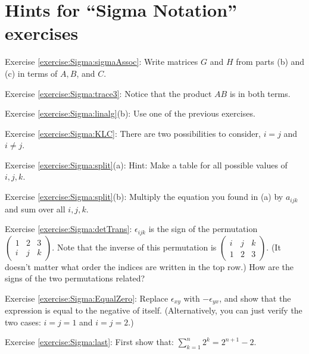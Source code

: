 \section{Hints for ``Sigma Notation'' exercises}\label{sec:sigma:hints} 


\noindent Exercise \ref{exercise:Sigma:sigmaAssoc}: Write matrices $G$ and $H$ from parts (b) and (c) in terms of $A,B$, and $C$.

\noindent Exercise \ref{exercise:Sigma:trace3}: Notice that the product ${AB}$ is in both terms.

\noindent Exercise \ref{exercise:Sigma:linalg}(b): Use one of the previous exercises.

\noindent Exercise \ref{exercise:Sigma:KLC}: There are two possibilities to consider, $i=j$ and $i \neq j$.

\noindent Exercise \ref{exercise:Sigma:split}(a): Hint: Make a table for all possible values of $i,j,k$.

\noindent Exercise \ref{exercise:Sigma:split}(b): Multiply the equation you found in (a) by $a_{ijk}$ and sum over all $i,j,k$.


\noindent Exercise \ref{exercise:Sigma:detTrans}: $\epsilon_{ijk}$ is the sign of the permutation $\left( \begin{smallmatrix}  1 & 2 & 3  \\ i & j & k  \end{smallmatrix} \right)$. Note that the inverse of this permutation is $ \left( \begin{smallmatrix}  i & j & k  \\ 1 & 2 & 3  \end{smallmatrix} \right)$.  (It doesn't matter what order the indices are written in the top row.) How are the signs of the two permutations related? 


\noindent Exercise \ref{exercise:Sigma:EqualZero}: Replace $\epsilon_{xy}$ with $-\epsilon_{yx}$, and show that the expression is equal to the negative of itself. (Alternatively, you can just verify the two cases:  $i=j=1$ and $i=j=2$.)


\noindent Exercise \ref{exercise:Sigma:last}: First show that:  $\sum_{k=1}^n 2^k = 2^{n+1} - 2$.
